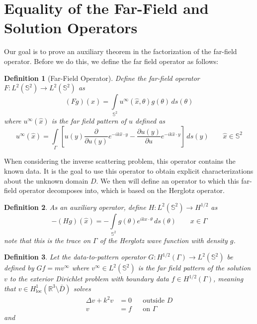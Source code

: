 \documentclass[]{article}
\newtheorem{definition}{Definition}
\newcommand{\R}{\mathbb R}
\renewcommand{\S}{\mathbb S}
\begin{document}
		\section{Equality of the Far-Field and Solution Operators}
			Our goal is to prove an auxiliary theorem in the factorization of the far-field operator. Before we do this, we define the far field operator as follows:
			\begin{definition}[Far-Field Operator]
				Define the far-field operator $F:L^2(\mathbb S^2) \to L^2(\mathbb S^2)$ as
				\begin{equation}	
					(Fg)(\hat x) = \int\limits_{\mathbb S^2}u^\infty(\hat x, \theta)g(\theta)\, ds(\theta) 
				\end{equation}
				where $u^\infty(\hat x)$ is the far field pattern of $u$ defined as
				\begin{equation}
					u^\infty(\hat x) = \int\limits_\Gamma\left[u(y)\frac{\partial }{\partial u(y)}e^{-ik\hat x\cdot y} - \frac{\partial u(y)}{\partial u}e^{-ik\hat x\cdot y}\right]\, ds(y) \qquad \hat x\in \S^2
				\end{equation}
			\end{definition}
			When considering the inverse scattering problem, this operator contains the known data. It is the goal to use this operator to obtain explicit characterizations about the unknown domain $D$. 
			We then will define an operator to which this far-field operator decomposes into, which is based on the Herglotz operator.
			\begin{definition}
				As an auxiliary operator, define $H: L^2(\mathbb S^2) \to H^{1/2}$ as
				\begin{equation}
					-(Hg)(\hat x) = -\int\limits_{\mathbb S^2}g(\theta)e^{ikx\cdot \theta}\,ds(\theta) \qquad x\in \Gamma
				\end{equation}
				note that this is the trace on $\Gamma$ of the Herglotz wave function with density $g$.
			\end{definition}
			\begin{definition}
				Let the data-to-pattern operator $G: H^{1/2}(\Gamma)\to L^2(\S^2)$ be defined by $Gf =m v^\infty$ where $v^\infty \in L^2(\S^2)$ is the far field pattern of the solution $v$ to the exterior Dirichlet problem with boundary data $f\in H^{1/2}(\Gamma)$, meaning that $v\in H^1_{\text{loc}}(\R^3\setminus\bar D)$ solves 
				\begin{align}
					\Delta v + k^2v &= 0 &&\text{outside }D\\
					v &= f && \text{on } \Gamma
				\end{align}
				and 
			\end{definition}
\end{document}
